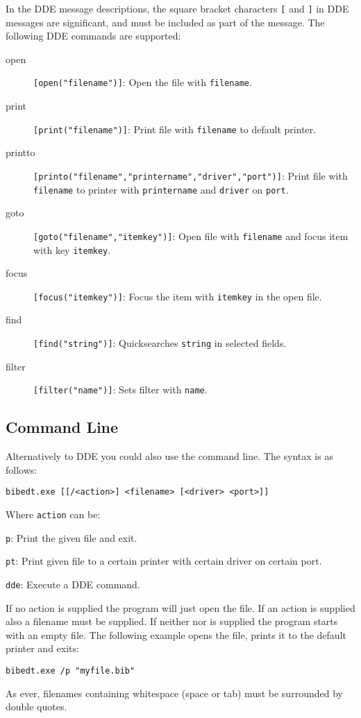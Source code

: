 \documentclass[oneside,10pt]{article}
\begin{document}
In the DDE message descriptions, the square bracket characters \verb|[| and \verb|]|
in DDE messages are significant, and must be included as part of the message.
The following DDE commands are supported:
\begin{description}
  \item[open] \verb|[open("filename")]|: Open the file with \verb|filename|.
  \item[print] \verb|[print("filename")]|: Print file with \verb|filename| to default
    printer.
  \item[printto] \verb|[printo("filename","printername","driver","port")]|: Print file with \verb|filename|
    to printer with \verb|printername| and \verb|driver| on \verb|port|.
  \item[goto] \verb|[goto("filename","itemkey")]|: Open file with \verb|filename| and
    focus item with key \verb|itemkey|.
  \item[focus] \verb|[focus("itemkey")]|: Focus the item with \verb|itemkey| in the
    open file.
  \item[find] \verb|[find("string")]|: Quicksearches \verb|string| in selected fields.
  \item[filter] \verb|[filter("name")]|: Sets filter with \verb|name|.
\end{description}

\subsection{Command Line}
\label{sec:CommandLine}

Alternatively to DDE you could also use the command line. The syntax is as follows:
\begin{verbatim}
bibedt.exe [[/<action>] <filename> [<driver> <port>]]
\end{verbatim}
Where \verb|action| can be:
\begin{description}
  \item{\verb|p|:} Print the given file and exit.
  \item{\verb|pt|:} Print given file to a certain printer with certain driver on
    certain port.
  \item{\verb|dde|:} Execute a DDE command.
\end{description}
If no action is supplied the program will just open the file. If an action is supplied
also a filename must be supplied. If neither nor is supplied the program starts
with an empty file. The following example opens the file, prints it to the default
printer and exits:
\begin{verbatim}
bibedt.exe /p "myfile.bib"
\end{verbatim}
As ever, filenames containing whitespace (space or tab) must be surrounded by double
quotes.
\end{document}
